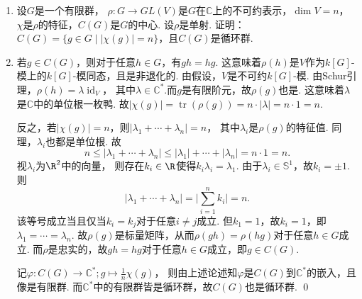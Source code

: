 \begin{enumerate}
    \begin{remark}
        上述同构是不典范的. 而事实上，有限Abel群$G$到其二次对偶有典范同构
        \[ G \simeq \widehat{\widehat{G}};\quad
        g \mapsto [g^{**}:\varphi \mapsto \varphi(g)].\]
    \end{remark}

\item[10.5] 设$G$是一个有限群，
    $\rho:G \rightarrow GL(V)$是$G$在$\mathbb{C}$上的不可约表示，$\dim V = n$，
    $\chi$是$\rho$的特征，$C(G)$是$G$的中心. 设$\rho$是单射. 
    证明：$C(G) = \{g \in G \mid |\chi(g)|=n\}$，且$C(G)$是循环群.
\item[\textbf{证明:}]
    若$g \in C(G)$，则对于任意$h \in G$，有$gh=hg$. 
    这意味着$\rho(h)$是$V$作为$k[G]$-模上的$k[G]$-模同态，且是非退化的.
    由假设，$V$是不可约$k[G]$-模. 
    由Schur引理，$\rho(h)=\lambda \operatorname{id}_{V}$，
    其中$\lambda \in \mathbb{C}^{*}$.而$g$是有限阶元，故$\rho(g)$也是. 
    这意味着$\lambda$是$\mathbb{C}$中的单位根一枚鸭.
    故$|\chi(g)|=\operatorname{tr}(\rho(g))=n \cdot |\lambda|=n \cdot 1 = n$.

    反之，若$|\chi(g)|=n$，则$|\lambda_{1} + \cdots + \lambda_{n}|=n$，
    其中$\lambda_{i}$是$\rho(g)$的特征值.
    同理，$\lambda_{i}$也都是单位根.
    故
        \[n \leq |\lambda_{1} + \cdots + \lambda_{n}| 
        \leq |\lambda_{1}| + \cdots + |\lambda_{n}| = n \cdot 1 = n.\]
    视$\lambda_{i}$为$\R^{2}$中的向量，
    则存在$k_{i} \in \R$使得$k_{i}\lambda_{i} = \lambda_{1}$.
    由于$\lambda_{i} \in \mathbb{S}^{1}$，故$k_{i} = \pm 1$. 则
        \[|\lambda_{1} + \cdots + \lambda_{n}| = \Big|\sum_{i=1}^{n}k_{i}\Big| = n.\]
    该等号成立当且仅当$k_{i}=k_{j}$对于任意$i \neq j$成立. 
    但$k_{1}=1$，故$k_{i}=1$，即$\lambda_{1}=\cdots=\lambda_{n}$.
    故$\rho(g)$是标量矩阵，从而$\rho(gh)=\rho(hg)$对于任意$h \in G$成立.
    而$\rho$是忠实的，故$gh=hg$对于任意$h \in G$成立，即$g \in C(G)$.

    记$\varphi: C(G) \rightarrow \mathbb{C}^{*}; 
    g \mapsto \frac{1}{n}\chi(g)$，
    则由上述论述知$\varphi$是$C(G)$到$\mathbb{C}^{*}$的嵌入，且像是有限群.
    而$\mathbb{C}^{*}$中的有限群皆是循环群，故$C(G)$也是循环群. \qed


\end{enumerate}

